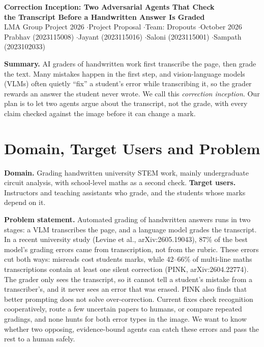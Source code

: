 \documentclass[11pt,a4paper]{article}
\begin{document}
\begin{center}
{\Large\bfseries Correction Inception: Two Adversarial Agents That Check\\[2pt] the Transcript Before a Handwritten Answer Is Graded}\\[6pt]
{\small LMA Group Project 2026 \quad$\cdot$\quad Project Proposal \quad$\cdot$\quad Team: Dropouts \quad$\cdot$\quad October 2026}\\[4pt]
{\small Prabhav (2023115008) \quad$\cdot$\quad Jayant (2023115016) \quad$\cdot$\quad Saloni (2023115001) \quad$\cdot$\quad Sampath (2023102033)}
\end{center}

\textbf{Summary.} AI graders of handwritten work first transcribe the page, then grade the text. Many mistakes happen in the first step, and vision-language models (VLMs) often quietly ``fix'' a student's error while transcribing it, so the grader rewards an answer the student never wrote. We call this \emph{correction inception}. Our plan is to let two agents argue about the transcript, not the grade, with every claim checked against the image before it can change a mark.

\section{Domain, Target Users and Problem}

\textbf{Domain.} Grading handwritten university STEM work, mainly undergraduate circuit analysis, with school-level maths as a second check.
\newline
\textbf{Target users.} Instructors and teaching assistants who grade, and the students whose marks depend on it.

\textbf{Problem statement.}
Automated grading of handwritten answers runs in two stages: a VLM transcribes the page, and a language model grades the transcript.
In a recent university study (Levine et al., arXiv:2605.19043), 87\% of the best model's grading errors came from transcription, not from the rubric.
These errors cut both ways: misreads cost students marks, while 42--66\% of multi-line maths transcriptions contain at least one silent correction (PINK, arXiv:2604.22774).
The grader only sees the transcript, so it cannot tell a student's mistake from a transcriber's, and it never sees an error that was erased.
PINK also finds that better prompting does not solve over-correction.
Current fixes check recognition cooperatively, route a few uncertain papers to humans, or compare repeated gradings, and none hunts for both error types in the image.
We want to know whether two opposing, evidence-bound agents can catch these errors and pass the rest to a human safely.
\end{document}
